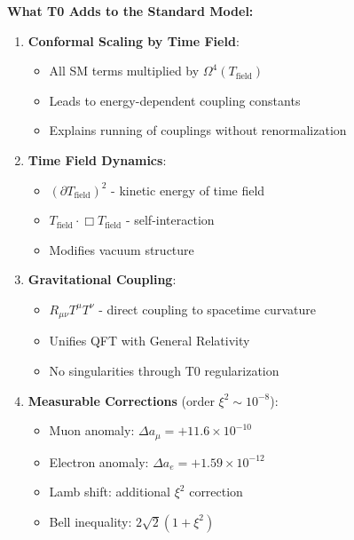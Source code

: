 \documentclass[12pt,a4paper]{article}
\begin{document}
	\textbf{What T0 Adds to the Standard Model:}
	
	\begin{tcolorbox}[colback=blue!5!white,colframe=blue!75!black,title=T0 Contributions to Extended Lagrangian Density]
		\begin{enumerate}
			\item \textbf{Conformal Scaling by Time Field}:
			\begin{itemize}
				\item All SM terms multiplied by $\Omega^4(T_{\text{field}})$
				\item Leads to energy-dependent coupling constants
				\item Explains running of couplings without renormalization
			\end{itemize}
			
			\item \textbf{Time Field Dynamics}:
			\begin{itemize}
				\item $(\partial T_{\text{field}})^2$ - kinetic energy of time field
				\item $T_{\text{field}} \cdot \Box T_{\text{field}}$ - self-interaction
				\item Modifies vacuum structure
			\end{itemize}
			
			\item \textbf{Gravitational Coupling}:
			\begin{itemize}
				\item $R_{\mu\nu} T^{\mu} T^{\nu}$ - direct coupling to spacetime curvature
				\item Unifies QFT with General Relativity
				\item No singularities through T0 regularization
			\end{itemize}
			
			\item \textbf{Measurable Corrections} (order $\xi^2 \sim 10^{-8}$):
			\begin{itemize}
				\item Muon anomaly: $\Delta a_{\mu} = +11.6 \times 10^{-10}$
				\item Electron anomaly: $\Delta a_{e} = +1.59 \times 10^{-12}$
				\item Lamb shift: additional $\xi^2$ correction
				\item Bell inequality: $2\sqrt{2}(1 + \xi^2)$
			\end{itemize}
		\end{enumerate}
	\end{tcolorbox}
	
\end{document}
